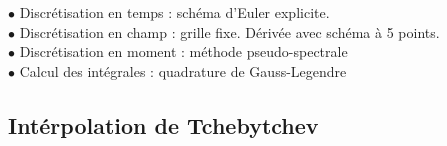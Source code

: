 \documentclass[9pt]{beamer}
\begin{document}
	\begin{frame}
	\justifying
	\vspace*{22pt}

	$\bullet$ Discrétisation en temps : schéma d'Euler explicite.\\
	$\bullet$ Discrétisation en champ : grille fixe. Dérivée avec schéma à 5 points. \\
	$\bullet$ Discrétisation en moment : méthode pseudo-spectrale \\
	$\bullet$ Calcul des intégrales : quadrature de Gauss-Legendre \\
	\vspace*{11pt}
	
	\end{frame}
	
	\subsection{Intérpolation de Tchebytchev}
	
\end{document}
